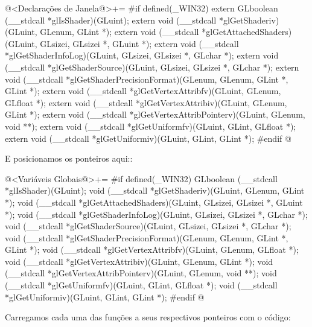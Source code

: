 \iniciocodigo
@<Declarações de Janela@>+=
#if defined(_WIN32)
extern GLboolean (__stdcall *glIsShader)(GLuint);
extern void (__stdcall *glGetShaderiv)(GLuint, GLenum, GLint *);
extern void (__stdcall *glGetAttachedShaders)(GLuint, GLsizei, GLsizei *,
                                              GLuint *);
extern void (__stdcall *glGetShaderInfoLog)(GLuint, GLsizei, GLsizei *, GLchar *);
extern void (__stdcall *glGetShaderSource)(GLuint, GLsizei, GLsizei *, GLchar *);
extern void (__stdcall *glGetShaderPrecisionFormat)(GLenum, GLenum, GLint *,
                                                    GLint *);
extern void (__stdcall *glGetVertexAttribfv)(GLuint, GLenum, GLfloat *);
extern void (__stdcall *glGetVertexAttribiv)(GLuint, GLenum, GLint *);
extern void (__stdcall *glGetVertexAttribPointerv)(GLuint, GLenum, void **);
extern void (__stdcall *glGetUniformfv)(GLuint, GLint, GLfloat *);
extern void (__stdcall *glGetUniformiv)(GLuint, GLint, GLint *);
#endif
@
\fimcodigo

E posicionamos os ponteiros aqui::

\iniciocodigo
@<Variáveis Globais@>+=
#if defined(_WIN32)
GLboolean (__stdcall *glIsShader)(GLuint);
void (__stdcall *glGetShaderiv)(GLuint, GLenum, GLint *);
void (__stdcall *glGetAttachedShaders)(GLuint, GLsizei, GLsizei *, GLuint *);
void (__stdcall *glGetShaderInfoLog)(GLuint, GLsizei, GLsizei *, GLchar *);
void (__stdcall *glGetShaderSource)(GLuint, GLsizei, GLsizei *, GLchar *);
void (__stdcall *glGetShaderPrecisionFormat)(GLenum, GLenum, GLint *, GLint *);
void (__stdcall *glGetVertexAttribfv)(GLuint, GLenum, GLfloat *);
void (__stdcall *glGetVertexAttribiv)(GLuint, GLenum, GLint *);
void (__stdcall *glGetVertexAttribPointerv)(GLuint, GLenum, void **);
void (__stdcall *glGetUniformfv)(GLuint, GLint, GLfloat *);
void (__stdcall *glGetUniformiv)(GLuint, GLint, GLint *);
#endif
@
\fimcodigo

Carregamos cada uma das funções a seus respectivos ponteiros com o
código:

